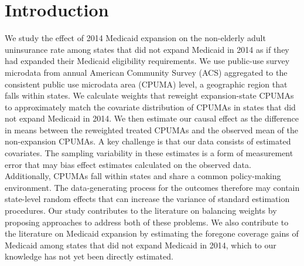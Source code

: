 \documentclass[aoas]{imsart}
\theoremstyle{plain}
\theoremstyle{remark}
\begin{document}

\section{Introduction}

We study the effect of 2014 Medicaid expansion on the non-elderly adult uninsurance rate among states that did not expand Medicaid in 2014 as if they had expanded their Medicaid eligibility requirements. We use public-use survey microdata from annual American Community Survey (ACS) aggregated to the consistent public use microdata area (CPUMA) level, a geographic region that falls within states. We calculate weights that reweight expansion-state CPUMAs to approximately match the covariate distribution of CPUMAs in states that did not expand Medicaid in 2014. We then estimate our causal effect as the difference in means between the reweighted treated CPUMAs and the observed mean of the non-expansion CPUMAs. A key challenge is that our data consists of estimated covariates. The sampling variability in these estimates is a form of measurement error that may bias effect estimates calculated on the observed data. Additionally, CPUMAs fall within states and share a common policy-making environment. The data-generating process for the outcomes therefore may contain state-level random effects that can increase the variance of standard estimation procedures. Our study contributes to the literature on balancing weights by proposing approaches to address both of these problems. We also contribute to the literature on Medicaid expansion by estimating the foregone coverage gains of Medicaid among states that did not expand Medicaid in 2014, which to our knowledge has not yet been directly estimated.
\end{document}
